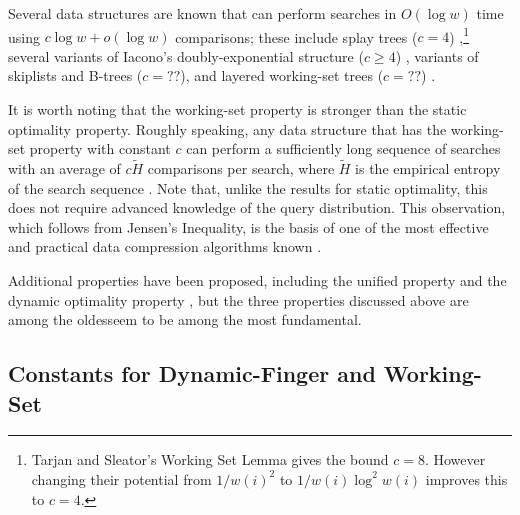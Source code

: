 \documentclass{patmorin}
\begin{document}
\begin{description}
    Several data structures are known that can perform searches in
    $O(\log w)$ time using $c\log w+o(\log w)$ comparisons; these include
    splay trees ($c=4$) \cite{X},\footnote{Tarjan and Sleator's Working
    Set Lemma \cite{X} gives the bound $c=8$.  However changing their
    potential from $1/w(i)^2$ to $1/w(i)\log^2 w(i)$ improves this to
    $c=4$.} several variants of Iacono's doubly-exponential structure
    ($c\ge 4$) \cite{X}, variants of skiplists and B-trees ($c=??$),
    and layered working-set trees ($c=??$) \cite{hXX}.

    It is worth noting that the working-set property is stronger than the
    static optimality property.  Roughly speaking, any data structure
    that has the working-set property with constant $c$ can perform a
    sufficiently long sequence of searches with an average of $c\tilde{H}$
    comparisons per search, where $\tilde{H}$ is the empirical entropy of
    the search sequence \cite{X,Y}.  Note that, unlike the results for
    static optimality, this does not require advanced knowledge of the
    query distribution.  This observation, which follows from Jensen's
    Inequality, is the basis of one of the most effective and practical
    data compression algorithms known \cite{mtf-compression,bzip}.

\end{description}
Additional properties have been proposed, including the unified property
\cite{IXX} and the dynamic optimality property \cite{X}, but the three
properties discussed above are among the oldesseem to be among the most fundamental.


\subsection{Constants for Dynamic-Finger and Working-Set}
\end{document}
